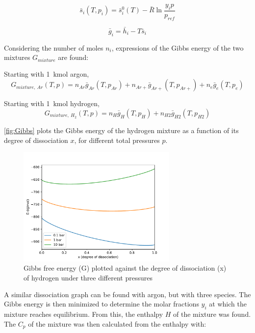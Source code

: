         \begin{equation}
            \bar s_i (T, p_i) = \bar s_i^0 (T) - \bar R \ln \frac{y_i p}{p_{ref}}
        \end{equation}

        \begin{equation}
            \bar g_i = \bar h_i - T \bar s_i
        \end{equation}

        Considering the number of moles $n_i$, expressions of the Gibbs energy of the two mixtures $G_{mixture}$ are found:

        Starting with \qty{1}{kmol} argon,
        \begin{equation}
            G_{mixture,\: Ar}(T, p) = n_{Ar} \bar g_{Ar}(T, p_{Ar}) + n_{Ar+} \bar g_{Ar+}(T, p_{Ar+}) + n_e \bar g_e(T, p_e)
        \end{equation}

        Starting with \qty{1}{kmol} hydrogen,
        \begin{equation}
            G_{mixture,\: H_2}(T, p) = n_H \bar g_H(T, p_H) + n_{H2} \bar g_{H2}(T, p_{H2})
        \end{equation}

        \autoref{fig:Gibbs} plots the Gibbs energy of the hydrogen mixture as a function of its degree of dissociation $x$, for different total pressures $p$.

        \begin{figure}[!ht]
            \centering
            \includegraphics[width=0.7\textwidth]{assets/2 models/Gibbs.pdf}
            \caption{Gibbs free energy (G) plotted against the degree of dissociation (x) of hydrogen under three different pressures}
            \label{fig:Gibbs}
        \end{figure}

        A similar dissociation graph can be found with argon, but with three species. The Gibbs energy is then minimized to determine the molar fractions $y_i$ at which the mixture reaches equilibrium. From this, the enthalpy $H$ of the mixture was found. The $C_p$ of the mixture was then calculated from the enthalpy with:

